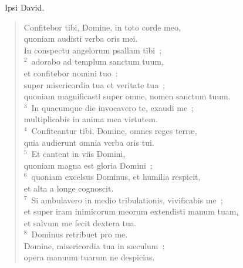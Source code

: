 ~\lettrine[lines=10,image=true,loversize=0.05,lraise=-0.03]{I}{}psi David. \begin{flushleft}\begin{verse}\vspace{6pt}Confitebor tibi, Domine, in toto corde meo,\\ quoniam audisti verba oris mei.\\ In conspectu angelorum psallam tibi~;\\
${}^{2}$~adorabo ad templum sanctum tuum,\\ et confitebor nomini tuo~:\\ super misericordia tua et veritate tua~;\\ quoniam magnificasti super omne, nomen sanctum tuum.\\
${}^{3}$~In quacumque die invocavero te, exaudi me~;\\ multiplicabis in anima mea virtutem.\\
${}^{4}$~Confiteantur tibi, Domine, omnes reges terr\ae ,\\ quia audierunt omnia verba oris tui.\\
${}^{5}$~Et cantent in viis Domini,\\ quoniam magna est gloria Domini~;\\
${}^{6}$~quoniam excelsus Dominus, et humilia respicit,\\ et alta a longe cognoscit.\\
${}^{7}$~Si ambulavero in medio tribulationis, vivificabis me~;\\ et super iram inimicorum meorum extendisti manum tuam,\\ et salvum me fecit dextera tua.\\
${}^{8}$~Dominus retribuet pro me.\\ Domine, misericordia tua in s\ae culum~;\\ opera manuum tuarum ne despicias.\end{verse}\end{flushleft}


